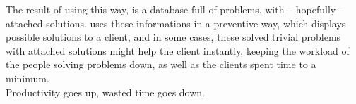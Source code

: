 The result of using \hdesk{} this way, is a database full of problems, with -- hopefully -- attached solutions. \hdesk{} uses these informations in a preventive way, which displays possible solutions to a client, and in some cases, these solved trivial problems with attached solutions might help the client instantly, keeping the workload of the people solving problems down, as well as the clients spent time to a minimum.\\
Productivity goes up, wasted time goes down.




